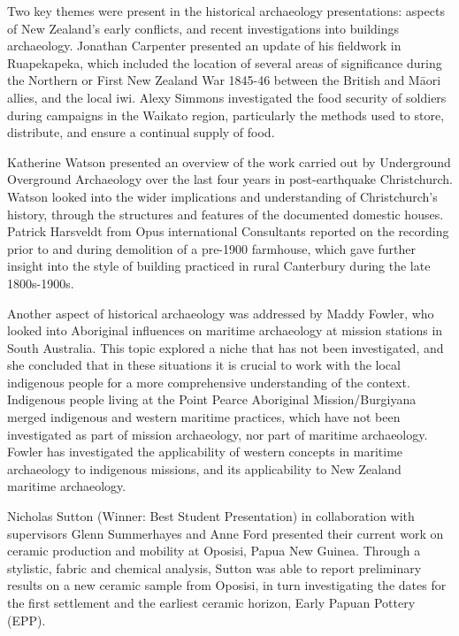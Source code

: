 
Two key themes were present in the historical archaeology presentations: aspects of New Zealand’s early conflicts, and recent investigations into buildings archaeology. Jonathan Carpenter presented an update of his fieldwork in Ruapekapeka, which included the location of several areas of significance during the Northern or First New Zealand War 1845-46 between the British and Māori allies, and the local iwi. Alexy Simmons investigated the food security of soldiers during campaigns in the Waikato region, particularly the methods used to store, distribute, and ensure a continual supply of food. 

Katherine Watson presented an overview of the work carried out by Underground Overground Archaeology over the last four years in post-earthquake Christchurch. Watson looked into the wider implications and understanding of Christchurch’s history, through the structures and features of the documented domestic houses. Patrick Harsveldt from Opus international Consultants reported on the recording prior to and during demolition of a pre-1900 farmhouse, which gave further insight into the style of building practiced in rural Canterbury during the late 1800s-1900s.

Another aspect of historical archaeology was addressed by Maddy Fowler, who looked into Aboriginal influences on maritime archaeology at mission stations in South Australia. This topic explored a niche that has not been investigated, and she concluded that in these situations it is crucial to work with the local indigenous people for a more comprehensive understanding of the context. Indigenous people living at the Point Pearce Aboriginal Mission/Burgiyana merged indigenous and western maritime practices, which have not been investigated as part of mission archaeology, nor part of maritime archaeology. Fowler has investigated the applicability of western concepts in maritime archaeology to indigenous missions, and its applicability to New Zealand maritime archaeology.


Nicholas Sutton (Winner: Best Student Presentation) in collaboration with supervisors Glenn Summerhayes and Anne Ford presented their current work on ceramic production and mobility at Oposisi, Papua New Guinea. Through a stylistic, fabric and chemical analysis, Sutton was able to report preliminary results on a new ceramic sample from Oposisi, in turn investigating the dates for the first settlement and the earliest ceramic horizon, Early Papuan Pottery (EPP).  

